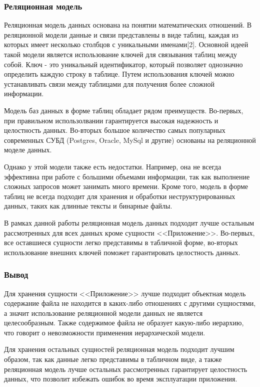 \subsubsection{Реляционная модель}

Реляционная модель данных\cite{relational-database} основана на понятии математических отношений. В реляционной модели данные и связи представлены в виде таблиц, каждая из которых имеет несколько столбцов с уникальными именами[2]. Основной идеей такой модели является использование ключей для связывания таблиц между собой. Ключ - это уникальный идентификатор, который позволяет однозначно определить каждую строку в таблице. Путем использования ключей можно устанавливать связи между таблицами для получения более сложной информации.

Модель баз данных в форме таблиц обладает рядом преимуществ. Во-первых, при правильном использолвании гарантируется высокая надежность и целостность данных. Во-вторых большое количество самых популарных современных СУБД (Postgres, Oracle, MySql и другие) основаны на реляционной моделе данных.

Однако у этой модели также есть недостатки. Например, она не всегда эффективна при работе с большими объемами информации, так как выполнение сложных запросов может занимать много времени. Кроме того, модель в форме таблиц не всегда подходит для хранения и обработки неструктурированных данных, таких как длинные тексты и бинарные файлы.

В рамках данной работы реляционная модель данных подходит лучше остальным рассмотренных для всех данных кроме сущности <<Приложение>>. Во-первых, все оставшиеся сущности легко представимы в табличной форме, во-вторых использование внешних ключей поможет гарантировать целостность данных.

\subsubsection{Вывод}

Для хранения сущности <<Приложение>> лучше подходит объектная модель содержание файла не находится в каких-либо отношениях с другими сущностями, а значит использование реляционной модели данных не является целесообразным. Также содержимое файла не образует какую-либо иерархию, что говорит о невозможности применения иерархической модели.

Для хранения остальных сущностей реляционная модель подходит лучшим образом, так как данные легко представимы в табличном виде, а также реляционная модель лучше остальных рассмотренных гарантирует целостность данных, что позволит избежать ошибок во время эксплуатации приложения.

